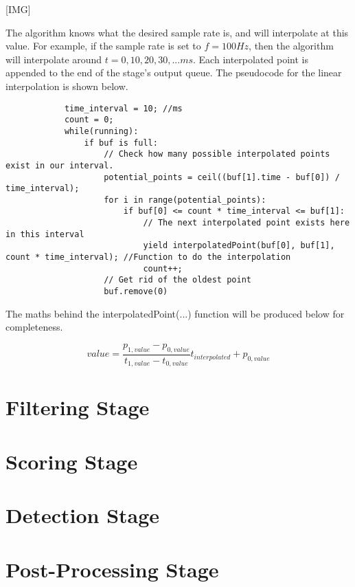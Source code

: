             [IMG]

            The algorithm knows what the desired sample rate is, and will interpolate at this value. For example, if the sample rate is set to $f = 100Hz$, then the algorithm will interpolate around $t = 0, 10, 20, 30, ... ms$. Each interpolated point is appended to the end of the stage's output queue. The pseudocode for the linear interpolation is shown below.

            \begin{verbatim}
            time_interval = 10; //ms
            count = 0;
            while(running):
                if buf is full:
                    // Check how many possible interpolated points exist in our interval.
                    potential_points = ceil((buf[1].time - buf[0]) / time_interval);
                    for i in range(potential_points):
                        if buf[0] <= count * time_interval <= buf[1]:
                            // The next interpolated point exists here in this interval
                            yield interpolatedPoint(buf[0], buf[1], count * time_interval); //Function to do the interpolation
                            count++;
                    // Get rid of the oldest point
                    buf.remove(0)
            \end{verbatim}

            The maths behind the interpolatedPoint(...) function will be produced below for completeness.

            \begin{equation}
                value = \frac{p_{1,value} - p_{0,value}}{t_{1,value} - t_{0,value}} t_{interpolated} + p_{0,value}
            \end{equation}



        \section{Filtering Stage}

        \section{Scoring Stage}

        \section{Detection Stage}

        \section{Post-Processing Stage}

